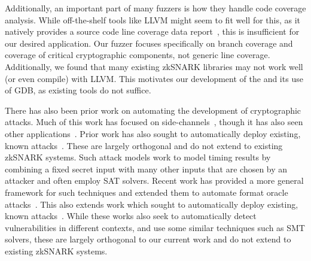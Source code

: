 

Additionally, an important part of many fuzzers is how they handle code coverage analysis.
While off-the-shelf tools like LLVM might seem to fit well for this, as it natively provides a source code line coverage data report~\cite{llvmcoverage}, this is insufficient for our desired application.  Our fuzzer focuses specifically on branch coverage and coverage of critical cryptographic components, not generic line coverage.  Additionally, we found that many existing zkSNARK libraries may not work well (or even compile) with LLVM.  This motivates our development of the \branchmodel and its use of GDB, as existing tools do not suffice.

There has also been prior work on automating the development of cryptographic attacks. Much of this work has focused on side-channels~\cite{phan2017synthesis,pasareanu2016multi,bang2018online}, though it has also seen other applications~\cite{beck2020automating}. Prior work has also sought to automatically deploy existing, known attacks~\cite{kupser2015break}.
These are largely orthogonal and do not extend to existing zkSNARK systems.
Such attack models work to model timing results by combining a fixed secret input with many other inputs that are chosen by an attacker and often employ SAT solvers.
Recent work has provided a more general framework for such techniques and extended them to automate format oracle attacks~\cite{beck2020automating}.
This also extends work which sought to automatically deploy existing, known attacks~\cite{kupser2015break}.  While these works also seek to automatically detect vulnerabilities in different contexts, and use some similar techniques such as SMT solvers, these are largely orthogonal to our current work and do not extend to existing zkSNARK systems.

